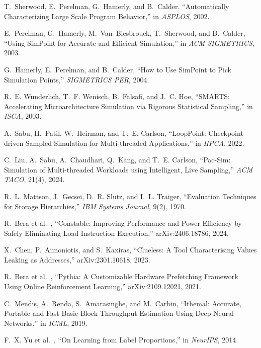 \documentclass[conference]{IEEEtran}
\newcommand{\etal}{et al.\ }
\begin{document}
\begin{thebibliography}{99}

T.~Sherwood, E.~Perelman, G.~Hamerly, and B.~Calder, ``Automatically Characterizing Large Scale Program Behavior,'' in \emph{ASPLOS}, 2002.

E.~Perelman, G.~Hamerly, M.~Van~Biesbrouck, T.~Sherwood, and B.~Calder, ``Using SimPoint for Accurate and Efficient Simulation,'' in \emph{ACM SIGMETRICS}, 2003.

G.~Hamerly, E.~Perelman, and B.~Calder, ``How to Use SimPoint to Pick Simulation Points,'' \emph{SIGMETRICS PER}, 2004.

R.~E. Wunderlich, T.~F. Wenisch, B.~Falsafi, and J.~C. Hoe, ``SMARTS: Accelerating Microarchitecture Simulation via Rigorous Statistical Sampling,'' in \emph{ISCA}, 2003.

A.~Sabu, H.~Patil, W.~Heirman, and T.~E. Carlson, ``LoopPoint: Checkpoint-driven Sampled Simulation for Multi-threaded Applications,'' in \emph{HPCA}, 2022.

C.~Liu, A.~Sabu, A.~Chaudhari, Q.~Kang, and T.~E. Carlson, ``Pac-Sim: Simulation of Multi-threaded Workloads using Intelligent, Live Sampling,'' \emph{ACM TACO}, 21(4), 2024.

R.~L. Mattson, J.~Gecsei, D.~R. Slutz, and I.~L. Traiger, ``Evaluation Techniques for Storage Hierarchies,'' \emph{IBM Systems Journal}, 9(2), 1970.

R.~Bera \etal, ``Constable: Improving Performance and Power Efficiency by Safely Eliminating Load Instruction Execution,'' arXiv:2406.18786, 2024.

X.~Chen, P.~Aimoniotis, and S.~Kaxiras, ``Clueless: A Tool Characterising Values Leaking as Addresses,'' arXiv:2301.10618, 2023.

R.~Bera \etal, ``Pythia: A Customizable Hardware Prefetching Framework Using Online Reinforcement Learning,'' arXiv:2109.12021, 2021.

C.~Mendis, A.~Renda, S.~Amarasinghe, and M.~Carbin, ``Ithemal: Accurate, Portable and Fast Basic Block Throughput Estimation Using Deep Neural Networks,'' in \emph{ICML}, 2019.

F.~X. Yu \etal, ``On Learning from Label Proportions,'' in \emph{NeurIPS}, 2014.


\end{thebibliography}
\end{document}
